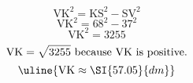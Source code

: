 \[\text{VK}^{2}=\text{KS}^{2}-\text{SV}^{2}\]
\[\text{VK}^{2}=68^{2}-37^{2}\]
\[\text{VK}^{2}=3255\]
\[\text{VK}=\sqrt{\mathstrut 3255}\text{ because VK is positive.}\]
\[\uline{\text{VK}\approx\SI{57.05}{dm}}\]
